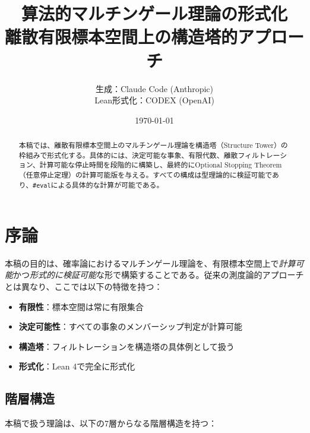 \documentclass[a4paper,12pt]{ltjsarticle}
\title{算法的マルチンゲール理論の形式化\\
  {\large 離散有限標本空間上の構造塔的アプローチ}}
\author{生成：Claude Code (Anthropic) \\
  Lean形式化：CODEX (OpenAI)}
\date{\today}
\theoremstyle{definition}
\begin{document}
\maketitle

\begin{abstract}
本稿では、離散有限標本空間上のマルチンゲール理論を構造塔（Structure Tower）の枠組みで形式化する。具体的には、決定可能な事象、有限代数、離散フィルトレーション、計算可能な停止時間を段階的に構築し、最終的にOptional Stopping Theorem（任意停止定理）の計算可能版を与える。すべての構成は型理論的に検証可能であり、\texttt{\#eval}による具体的な計算が可能である。
\end{abstract}

\tableofcontents

\section{序論}

本稿の目的は、確率論におけるマルチンゲール理論を、有限標本空間上で\emph{計算可能}かつ\emph{形式的に検証可能}な形で構築することである。従来の測度論的アプローチとは異なり、ここでは以下の特徴を持つ：

\begin{itemize}
\item \textbf{有限性}：標本空間は常に有限集合
\item \textbf{決定可能性}：すべての事象のメンバーシップ判定が計算可能
\item \textbf{構造塔}：フィルトレーションを構造塔の具体例として扱う
\item \textbf{形式化}：Lean 4で完全に形式化
\end{itemize}

\subsection{階層構造}

本稿で扱う理論は、以下の7層からなる階層構造を持つ：
\end{document}
